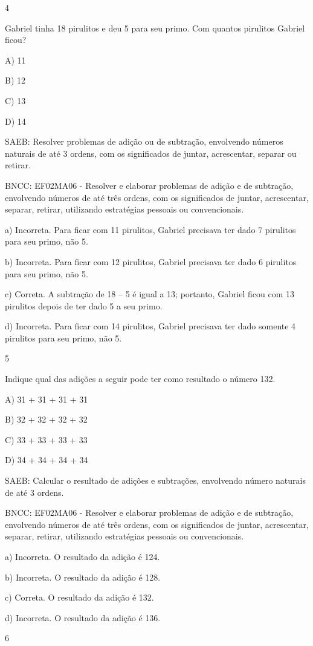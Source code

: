 \begin{escolha}
\begin{escolha}
{{{{\num{4}

Gabriel tinha 18 pirulitos e deu 5 para seu primo. Com quantos
pirulitos Gabriel ficou?

A) 11

B) 12

C) 13

D) 14

SAEB: Resolver problemas de adição ou de subtração, envolvendo
números naturais de até 3 ordens, com os significados de juntar,
acrescentar, separar ou retirar.

BNCC: EF02MA06 - Resolver e elaborar problemas de adição e de subtração,
envolvendo números de até três ordens, com os significados de juntar,
acrescentar, separar, retirar, utilizando estratégias pessoais ou convencionais.

a) Incorreta. Para ficar com 11 pirulitos, Gabriel precisava ter dado 7
pirulitos para seu primo, não 5.

b) Incorreta. Para ficar com 12 pirulitos, Gabriel precisava ter dado 6
pirulitos para seu primo, não 5.

c) Correta. A subtração de 18 -- 5 é igual a 13; portanto, Gabriel ficou
com 13 pirulitos depois de ter dado 5 a seu primo.

d) Incorreta. Para ficar com 14 pirulitos, Gabriel precisava ter dado
somente 4 pirulitos para seu primo, não 5.

\num{5}

Indique qual das adições a seguir pode ter como resultado o número 132.

A) 31 + 31 + 31 + 31

B) 32 + 32 + 32 + 32

C) 33 + 33 + 33 + 33

D) 34 + 34 + 34 + 34

SAEB: Calcular o resultado de adições e subtrações, envolvendo
número naturais de até 3 ordens.

BNCC: EF02MA06 - Resolver e elaborar problemas de adição e de subtração,
envolvendo números de até três ordens, com os significados de juntar,
acrescentar, separar, retirar, utilizando estratégias pessoais ou
convencionais.

a) Incorreta. O resultado da adição é 124.

b) Incorreta. O resultado da adição é 128.

c) Correta. O resultado da adição é 132.

d) Incorreta. O resultado da adição é 136.

\num{6}

}}}}
\end{escolha}
\end{escolha}
